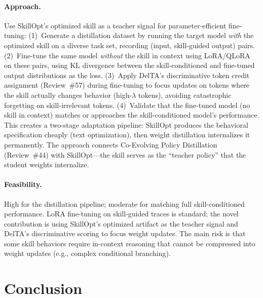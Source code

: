 \documentclass[11pt,a4paper]{article}
\begin{document}
\paragraph{Approach.}
Use SkillOpt's optimized skill as a teacher signal for parameter-efficient fine-tuning: (1)~Generate a distillation dataset by running the target model \emph{with} the optimized skill on a diverse task set, recording (input, skill-guided output) pairs. (2)~Fine-tune the same model \emph{without} the skill in context using LoRA/QLoRA on these pairs, using KL divergence between the skill-conditioned and fine-tuned output distributions as the loss. (3)~Apply DelTA's discriminative token credit assignment (Review~\#57) during fine-tuning to focus updates on tokens where the skill actually changes behavior (high-$\lambda$ tokens), avoiding catastrophic forgetting on skill-irrelevant tokens. (4)~Validate that the fine-tuned model (no skill in context) matches or approaches the skill-conditioned model's performance. This creates a two-stage adaptation pipeline: SkillOpt produces the behavioral specification cheaply (text optimization), then weight distillation internalizes it permanently. The approach connects Co-Evolving Policy Distillation (Review~\#44) with SkillOpt---the skill serves as the ``teacher policy'' that the student weights internalize.

\paragraph{Feasibility.}
High for the distillation pipeline; moderate for matching full skill-conditioned performance. LoRA fine-tuning on skill-guided traces is standard; the novel contribution is using SkillOpt's optimized artifact as the teacher signal and DelTA's discriminative scoring to focus weight updates. The main risk is that some skill behaviors require in-context reasoning that cannot be compressed into weight updates (e.g., complex conditional branching).

\section*{Conclusion}
\end{document}
